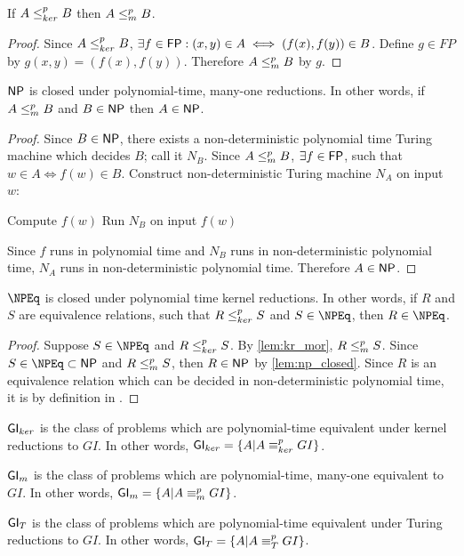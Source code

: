 \begin{lemma}\label{lem:kr_mor}If $A\leq^{p}_{ker} B$ then $A\leq^{p}_{m} B$.\end{lemma}
\begin{proof}Since $A\leq^{p}_{ker} B$, $\exists f\in{\ensuremath{\mathsf{FP}}}: (x,y)\in A\iff(f(x), f(y))\in
  B$. Define $g\in FP$ by $g(x,y)=(f(x), f(y))$. Therefore $A\leq^{p}_{m} B$ by
  $g$.\end{proof}

\begin{lemma}\label{lem:np_closed}${\mathsf{NP}}$ is closed under polynomial-time,
  many-one reductions. In other words, if $A\leq^{p}_{m} B$ and $B\in{\ensuremath{\mathsf{NP}}}$ then
  $A\in{\ensuremath{\mathsf{NP}}}$.\end{lemma}
\begin{proof}
  Since $B\in{\ensuremath{\mathsf{NP}}}$, there exists a non-deterministic polynomial time Turing
  machine which decides $B$; call it $N_B$. Since $A\leq^{p}_{m} B$, $\exists f\in{\ensuremath{\mathsf{FP}}}$,
  such that $w\in A\iff f(w)\in B$. Construct non-deterministic Turing machine
  $N_A$ on input $w$:\\
  \begin{algorithm}[H]
    Compute $f(w)$\;
    Run $N_B$ on input $f(w)$\;
    \;
    \lElse{\REJECT}\;
  \end{algorithm}
  Since $f$ runs in polynomial time and $N_B$ runs in non-deterministic
  polynomial time, $N_A$ runs in non-deterministic polynomial time. Therefore
  $A\in{\ensuremath{\mathsf{NP}}}$.
\end{proof}

\begin{corollary}\label{cor:npeq_closed}$\NPEq$ is closed under polynomial time
  kernel reductions. In other words, if $R$ and $S$ are equivalence relations,
  such that $R\leq^{p}_{ker} S$ and $S\in\NPEq$, then $R\in\NPEq$.\end{corollary}
\begin{proof}Suppose $S\in\NPEq$ and $R\leq^{p}_{ker} S$. By \autoref{lem:kr_mor},
  $R\leq^{p}_{m} S$. Since $S\in\NPEq\subset\NP$ and $R\leq^{p}_{m} S$, then $R\in{\ensuremath{\mathsf{NP}}}$ by
  \autoref{lem:np_closed}. Since $R$ is an equivalence relation which can be
  decided in non-deterministic polynomial time, it is by definition in \NPEq.
\end{proof}

\begin{definition}\label{def:gi_classes}${\mathsf{GI}}_{ker}$ is the class of problems
  which are polynomial-time equivalent under kernel reductions to $GI$. In
  other words, ${\mathsf{GI}}_{ker}=\{A|A\equiv^{p}_{ker} GI\}$.

  ${\mathsf{GI}}_m$ is the class of problems which are polynomial-time, many-one
  equivalent to $GI$. In other words, ${\mathsf{GI}}_m=\{A|A\equiv^{p}_m GI\}$.

  ${\mathsf{GI}}_T$ is the class of problems which are polynomial-time equivalent under
  Turing reductions to $GI$. In other words, ${\mathsf{GI}}_T=\{A|A\equiv^{p}_T GI\}$.
\end{definition}

